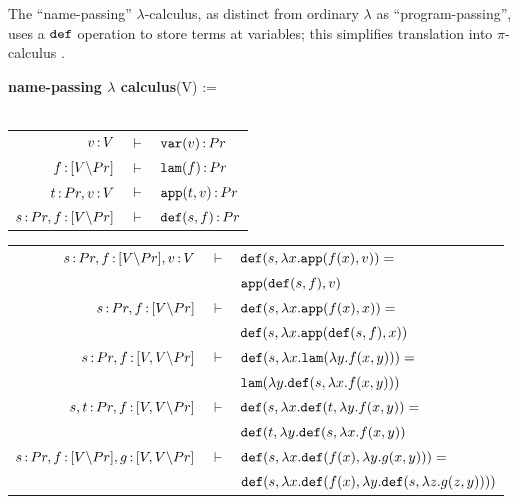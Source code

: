 \documentclass{article}
\begin{document}
\newpage

The ``name-passing'' $\lambda$-calculus, as distinct from ordinary $\lambda$ as ``program-passing'', uses a $\mathtt{def}$ operation to store terms at variables; this simplifies translation into $\pi$-calculus \cite{boudol}.
\begin{mdframed}
    \begin{center}
        \textbf{name-passing $\lambda$ calculus}(V) :=\\~\\
    
        \renewcommand{\arraystretch}{1.2}
        \begin{tabular}{rcl}
             $v\,{:}\, V$ & $\vdash$ & $\mathtt{var}(v)\,{:}\, Pr$\\
             $f\,{:}\, [V{\setminus} Pr]$ & $\vdash$ & $\mathtt{lam}(f)\,{:}\, Pr$\\
             $t\,{:}\, Pr, v\,{:}\, V$ & $\vdash$ & $\mathtt{app}(t,v)\,{:}\, Pr$\\
             $s\,{:}\, Pr, f\,{:}\, [V{\setminus} Pr]$ & $\vdash$ & $\mathtt{def}(s,f)\,{:}\, Pr$
        \end{tabular}

        \vspace{1em}

        \begin{tabular}{rcl}
             $s\,{:}\, Pr, f\,{:}\, [V{\setminus} Pr], v\,{:}\, V$ & $\vdash$ & $\mathtt{def}(s, \lambda x.\mathtt{app}(f(x),v)) = $\\
             && $\mathtt{app}(\mathtt{def}(s,f), v)$\\
             $s\,{:}\, Pr, f\,{:}\, [V{\setminus} Pr]$ & $\vdash$ & $\mathtt{def}(s,\lambda x.\mathtt{app}(f(x),x)) = $\\
             && $\mathtt{def}(s,\lambda x.\mathtt{app}(\mathtt{def}(s,f),x))$\\
             $s\,{:}\, Pr, f\,{:}\, [V,V{\setminus} Pr]$ & $\vdash$ & $\mathtt{def}(s,\lambda x.\mathtt{lam}(\lambda y.f(x,y))) = $\\
             && $\mathtt{lam}(\lambda y. \mathtt{def}(s,\lambda x.f(x,y)))$\\
             $s,t\,{:}\, Pr, f\,{:}\, [V,V{\setminus} Pr]$ & $\vdash$ & $\mathtt{def}(s,\lambda x.\mathtt{def}(t,\lambda y.f(x,y)) = $\\
             && $\mathtt{def}(t,\lambda y.\mathtt{def}(s,\lambda x.f(x,y))$\\
             $s\,{:}\, Pr, f\,{:}\, [V{\setminus} Pr], g\,{:}\, [V,V{\setminus} Pr]$ & $\vdash$ & $\mathtt{def}(s,\lambda x.\mathtt{def}(f(x), \lambda y.g(x,y))) = $\\
             && $\mathtt{def}(s,\lambda x.\mathtt{def}(f(x),\lambda y.\mathtt{def}(s, \lambda z.g(z,y))))$
        \end{tabular}


\end{center}
\end{mdframed}
\end{document}
